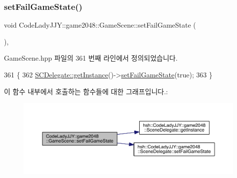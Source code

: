 \mbox{\label{class_code_lady_j_j_y_1_1game2048_1_1_game_scene_a85a543aab574d4d4c883da63e57ab47f}} 
\subsubsection{\texorpdfstring{set\+Fail\+Game\+State()}{setFailGameState()}}
{\footnotesize\ttfamily void Code\+Lady\+J\+J\+Y\+::game2048\+::\+Game\+Scene\+::set\+Fail\+Game\+State (\begin{DoxyParamCaption}{ }\end{DoxyParamCaption})\hspace{0.3cm}{\ttfamily [inline]}, {\ttfamily [private]}}



Game\+Scene.\+hpp 파일의 361 번째 라인에서 정의되었습니다.


\begin{DoxyCode}
361                            \{
362         \hyperlink{classhsh_1_1_code_lady_j_j_y_1_1game2048_1_1_scene_delegate_a332a574da455fb687b5d283399a6976c}{SCDelegate::getInstance}()->\hyperlink{classhsh_1_1_code_lady_j_j_y_1_1game2048_1_1_scene_delegate_adc205b068a4df3da173c37d4236a4e25}{setFailGameState}(\textcolor{keyword}{true});
363     \}
\end{DoxyCode}
이 함수 내부에서 호출하는 함수들에 대한 그래프입니다.\+:
\nopagebreak
\begin{figure}[H]
\begin{center}
\leavevmode
\includegraphics[width=350pt]{d1/d76/class_code_lady_j_j_y_1_1game2048_1_1_game_scene_a85a543aab574d4d4c883da63e57ab47f_cgraph}
\end{center}
\end{figure}
\mbox{\label{class_code_lady_j_j_y_1_1game2048_1_1_game_scene_ae674d90ff1c81818e308c99da876fbe8}} 
